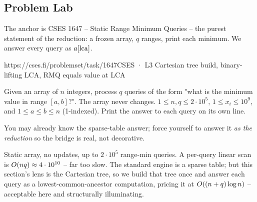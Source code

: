 \subsection{Problem Lab}

The anchor is CSES 1647 -- Static Range Minimum Queries -- the purest statement of the reduction: a
frozen array, $q$ ranges, print each minimum. We answer every query as $a[\operatorname{lca}]$.

  {https://cses.fi/problemset/task/1647}{CSES · L3}
  {Cartesian tree build, binary-lifting LCA, RMQ equals value at LCA}

\begin{problemstatement}
Given an array of $n$ integers, process $q$ queries of the form "what is the minimum value in range
$[a,b]$?". The array never changes. $1 \le n,q \le 2\cdot10^{5}$, $1 \le x_i \le 10^{9}$, and
$1 \le a \le b \le n$ (1-indexed). Print the answer to each query on its own line.
\end{problemstatement}

\begin{attemptgate}
You may already know the sparse-table answer; force yourself to answer it \emph{as the reduction} so the
bridge is real, not decorative.
\end{attemptgate}

Static array, no updates, up to $2\cdot10^5$ range-min queries. A per-query linear scan is $O(nq)
\approx 4\cdot10^{10}$ -- far too slow. The standard engine is a sparse table; but this section's lens is
the Cartesian tree, so we build that tree once and answer each query as a lowest-common-ancestor
computation, pricing it at $O((n+q)\log n)$ -- acceptable here and structurally illuminating.


